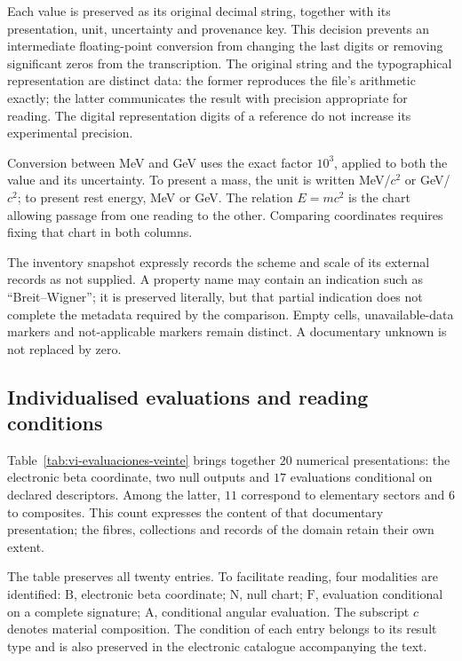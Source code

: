 Each value is preserved as its original decimal string, together with its
presentation, unit, uncertainty and provenance key. This decision
prevents an intermediate floating-point conversion from changing the last
digits or removing significant zeros from the transcription. The original
string and the typographical representation are distinct data: the
former reproduces the file's arithmetic exactly; the
latter communicates the result with precision appropriate for reading.
The digital representation digits of a reference do not increase its
experimental precision.

Conversion between MeV and GeV uses the exact factor \(10^3\), applied
to both the value and its uncertainty. To present a mass, the unit is written
MeV/\(c^2\) or GeV/\(c^2\); to present rest energy,
MeV or GeV. The relation \(E=mc^2\) is the chart allowing passage from one
reading to the other. Comparing coordinates requires fixing that chart in
both columns.

The inventory snapshot expressly records the scheme and scale of its external
records as not supplied. A property name
may contain an indication such as “Breit--Wigner”; it is preserved literally,
but that partial indication does not complete the metadata required by the comparison.
Empty cells, unavailable-data markers and
not-applicable markers remain distinct. A documentary unknown
is not replaced by zero.

\subsection{Individualised evaluations and reading conditions}
\label{subsec:vi-evaluaciones-documentadas}

Table~\ref{tab:vi-evaluaciones-veinte} brings together \(20\) numerical
presentations: the electronic beta coordinate, two null outputs and
\(17\) evaluations conditional on declared descriptors. Among
the latter, \(11\) correspond to elementary sectors and \(6\) to
composites. This count expresses the content of that documentary presentation;
the fibres, collections and records of the domain retain their own extent.

The table preserves all twenty entries. To facilitate reading,
four modalities are identified: \(\mathrm{B}\), electronic beta
coordinate; \(\mathrm{N}\), null chart; \(\mathrm{F}\), evaluation
conditional on a complete signature; \(\mathrm{A}\), conditional angular
evaluation. The subscript \(c\) denotes material composition. The
condition of each entry belongs to its result type and is also preserved
in the electronic catalogue accompanying the text.

